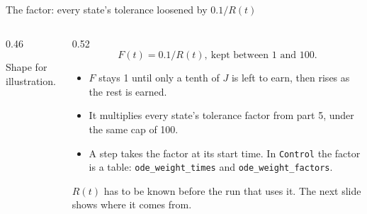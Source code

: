 \documentclass[aspectratio=169,10pt]{beamer}
\newcommand{\illus}{\par{\tiny\color{quiet} Shape for illustration.}}
\begin{document}
\begin{frame}{The factor: every state's tolerance loosened by $0.1/R(t)$}
  \begin{columns}[T]
    \begin{column}{0.46\textwidth}
      \illus
    \end{column}
    \begin{column}{0.52\textwidth}
      \small
      \[ F(t) = 0.1/R(t), \ \text{kept between 1 and 100.} \]
      \begin{itemize}
        \item $F$ stays 1 until only a tenth of $J$ is left to earn, then rises as the rest is
          earned.
        \item It multiplies every state's tolerance factor from part 5, under the same cap of
          100.
        \item A step takes the factor at its start time. In \texttt{Control} the factor is a
          table: \texttt{ode\_weight\_times} and \texttt{ode\_weight\_factors}.
      \end{itemize}
      $R(t)$ has to be known before the run that uses it. The next slide shows where it comes
      from.
    \end{column}
  \end{columns}
\end{frame}
\end{document}
